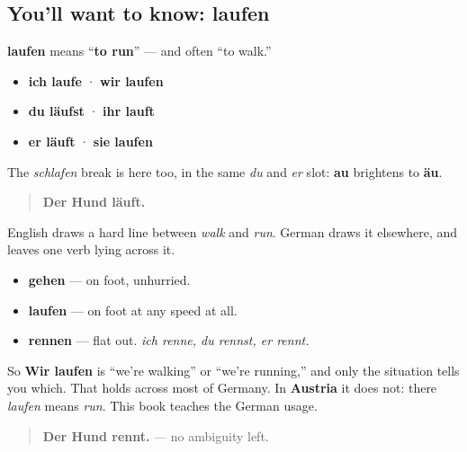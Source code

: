 \subsection*{You'll want to know: laufen}
\textbf{laufen} means \textquotedblleft{}\textbf{to run}\textquotedblright{} — and often \textquotedblleft{}to walk.\textquotedblright{}

\begin{itemize}
\raggedright
  \item \textbf{ich laufe} · \textbf{wir laufen}
  \item \textbf{du läufst} · \textbf{ihr lauft}
  \item \textbf{er läuft} · \textbf{sie laufen}
\end{itemize}

The \emph{schlafen} break is here too, in the same \emph{du} and \emph{er} slot: \textbf{au} brightens to \textbf{äu}.

\begin{quote}
\textbf{Der Hund läuft.}
\end{quote}

\begin{culture}
English draws a hard line between \emph{walk} and \emph{run}. German draws it elsewhere, and leaves one verb lying across it.

\begin{itemize}
\raggedright
  \item \textbf{gehen} — on foot, unhurried.
  \item \textbf{laufen} — on foot at any speed at all.
  \item \textbf{rennen} — flat out. \emph{ich renne, du rennst, er rennt.}
\end{itemize}

So \textbf{Wir laufen} is \textquotedblleft{}we're walking\textquotedblright{} or \textquotedblleft{}we're running,\textquotedblright{} and only the situation tells you which. That holds across most of Germany. In \textbf{Austria} it does not: there \emph{laufen} means \emph{run}. This book teaches the German usage.

\begin{quote}
\textbf{Der Hund rennt.} — no ambiguity left.
\end{quote}
\end{culture}

